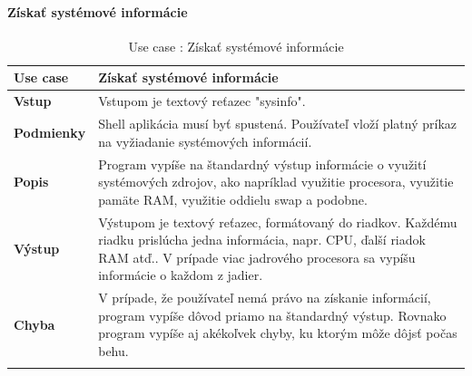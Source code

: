 \paragraph{Získať systémové informácie}
\begin{center}
	\begin{longtable}{|p{2.5cm}|p{12.2cm}|}
		
			\hline
			\textbf{Use case} & Získať systémové informácie \\ 
			\hline
			\textbf{Vstup} & Vstupom je textový reťazec "sysinfo".\\
			\hline
			\textbf{Podmienky} & Shell aplikácia musí byť spustená. Používateľ vloží platný príkaz na vyžiadanie systémových informácií. \\ 
			\hline
			\textbf{Popis} & Program vypíše na štandardný výstup informácie o využití systémových zdrojov,  ako napríklad využitie procesora, využitie pamäte RAM, využitie oddielu swap a podobne.\\ 
			\hline
					
			\textbf{Výstup} & Výstupom je textový reťazec, formátovaný do riadkov. Každému riadku prislúcha jedna informácia, napr. CPU, ďalší riadok RAM atď.. V prípade viac jadrového procesora sa vypíšu informácie o každom z jadier.  \\
			\hline
			\textbf{Chyba} & V prípade, že používateľ nemá právo na získanie informácií, program vypíše dôvod priamo na štandardný výstup. Rovnako program vypíše aj akékoľvek chyby, ku ktorým môže dôjsť počas behu.\\
			\hline
		\caption{Use case : Získať systémové informácie}
		\label{table:1}
		
	\end{longtable}
\end{center}

